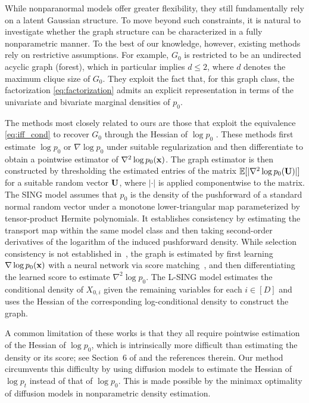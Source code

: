 \documentclass[11pt,a4paper,final]{article}
\numberwithin{equation}{section}
\theoremstyle{remark}
\newcommand{\bU}{{\bf U}}
\newcommand{\bx}{{\bf x}}
\newcommand{\bbE}{{\mathbb E}}
\begin{document}
While nonparanormal models offer greater flexibility, they still fundamentally rely on a latent Gaussian structure. To move beyond such constraints, it is natural to investigate whether the graph structure can be characterized in a fully nonparametric manner.
To the best of our knowledge, however, existing methods rely on restrictive assumptions.
For example, $G_{0}$ is restricted to be an undirected acyclic graph (forest), which in particular implies $d \leq 2$, where $d$ denotes the maximum clique size of $G_{0}$.
They exploit the fact that, for this graph class, the factorization \eqref{eq:factorization} admits an explicit representation in terms of the univariate and bivariate marginal densities of $p_{0}$.

The methods most closely related to ours are those that exploit the equivalence \eqref{eq:iff_cond} to recover $G_{0}$ through the Hessian of $\log p_{0}$ \citep{baptista2024learning, zheng2023generalized, liaw2025learning}.
These methods first estimate $\log p_{0}$ or $\nabla \log p_{0}$ under suitable regularization and then differentiate to obtain a pointwise estimator of $\nabla^2 \log p_0(\bx)$.
The graph estimator is then constructed by thresholding the estimated entries of the matrix $\bbE [ \vert \nabla^2 \log p_{0}(\bU) \vert ]$ for a suitable random vector $\bU$, where $\vert \cdot \vert$ is applied componentwise to the matrix.
The SING model \citep{baptista2024learning} assumes that $p_{0}$ is the density of the pushforward of a standard normal random vector under a monotone lower-triangular map parameterized by tensor-product Hermite polynomials.
It establishes consistency by estimating the transport map within the same model class and then taking second-order derivatives of the logarithm of the induced pushforward density.
While selection consistency is not established in~\cite{zheng2023generalized}, the graph is estimated by first learning $\nabla \log p_{0}(\bx)$ with a neural network via score matching~\citep{hyvarinen2005estimation}, and then differentiating the learned score to estimate $\nabla^2 \log p_0$.
The L-SING model \citep{liaw2025learning} estimates the conditional density of $X_{0,i}$ given the remaining variables for each $i \in [D]$ and uses the Hessian of the corresponding log-conditional density to construct the graph.

A common limitation of these works is that they all require pointwise estimation of the Hessian of $\log p_{0}$, which is intrinsically more difficult than estimating the density or its score; see Section~6 of \cite{kwon2026nonparametric} and the references therein.
Our method circumvents this difficulty by using diffusion models to estimate the Hessian of $\log p_{t}$ instead of that of $\log p_{0}$.
This is made possible by the minimax optimality of diffusion models in nonparametric density estimation.
\end{document}
